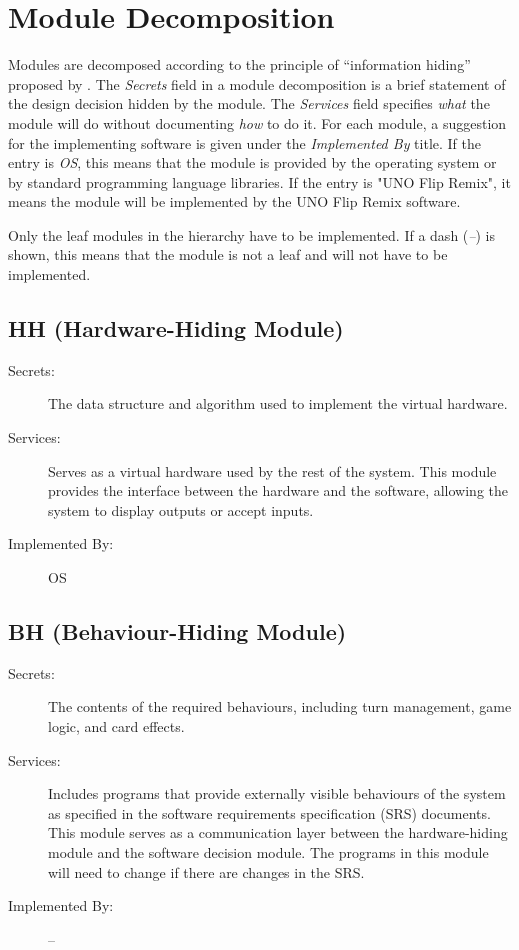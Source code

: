 \documentclass[12pt, titlepage]{article}
\begin{document}
\section{Module Decomposition} \label{SecMD}

Modules are decomposed according to the principle of ``information hiding''
proposed by \citet{ParnasEtAl1984}. The \emph{Secrets} field in a module
decomposition is a brief statement of the design decision hidden by the
module. The \emph{Services} field specifies \emph{what} the module will do
without documenting \emph{how} to do it. For each module, a suggestion for the
implementing software is given under the \emph{Implemented By} title. If the
entry is \emph{OS}, this means that the module is provided by the operating
system or by standard programming language libraries.  If the entry is "UNO Flip Remix", it means the module will be implemented by the UNO Flip Remix software.

Only the leaf modules in the hierarchy have to be implemented. If a dash
(\emph{--}) is shown, this means that the module is not a leaf and will not have
to be implemented.

\subsection{HH (Hardware-Hiding Module)} \label{mHH}

\begin{description}
\item[Secrets:] The data structure and algorithm used to implement the virtual hardware.
\item[Services:] Serves as a virtual hardware used by the rest of the system. This module provides the interface between the hardware and the software, allowing the system to display outputs or accept inputs.
\item[Implemented By:] OS
\end{description}

\subsection{BH (Behaviour-Hiding Module)} \label{mBH}

\begin{description}
\item[Secrets:] The contents of the required behaviours, including turn management, game logic, and card effects.
\item[Services:] Includes programs that provide externally visible behaviours of the system as specified in the software requirements specification (SRS) documents. This module serves as a communication layer between the hardware-hiding module and the software decision module. The programs in this module will need to change if there are changes in the SRS.
\item[Implemented By:] --
\end{description}
\end{document}
